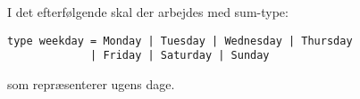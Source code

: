 I det efterfølgende skal der arbejdes med sum-type:
\begin{lstlisting}
type weekday = Monday | Tuesday | Wednesday | Thursday
             | Friday | Saturday | Sunday
\end{lstlisting}
som repræsenterer ugens dage.

